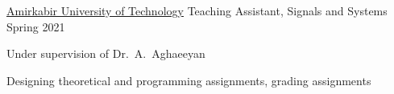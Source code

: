 \begin{cventries}
  \cventry
    {\href{https://aut.ac.ir/}{Amirkabir University of Technology}} %
    {Teaching Assistant, Signals and Systems} %
    {} %
    {Spring 2021} %
    {
      \begin{cvitems} %
        \item {Under supervision of Dr.~A.~Aghaeeyan}
        \item {Designing theoretical and programming assignments, grading assignments}
      \end{cvitems}
    }

\end{cventries}